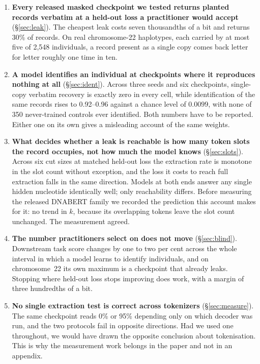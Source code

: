 \begin{enumerate}\itemsep2pt
\item \textbf{Every released masked checkpoint we tested returns planted records verbatim at a
held-out loss a practitioner would accept} (\S\ref{sec:leak}). The cheapest leak costs seven
thousandths of a bit and returns 30\% of records. On real chromosome-22 haplotypes, each carried by
at most five of 2{,}548 individuals, a record present as a single copy comes back letter for letter
roughly one time in ten.

\item \textbf{A model identifies an individual at checkpoints where it reproduces nothing at all}
(\S\ref{sec:ident}). Across three seeds and six checkpoints, single-copy verbatim recovery is exactly
zero in every cell, while identification of the same records rises to 0.92--0.96 against a chance
level of $0.0099$, with none of 350 never-trained controls ever identified. Both numbers have to be
reported. Either one on its own gives a misleading account of the same weights.

\item \textbf{What decides whether a leak is reachable is how many token slots the record occupies,
not how much the model knows} (\S\ref{sec:slots}). Across six cut sizes at matched held-out loss the
extraction rate is monotone in the slot count without exception, and the loss it costs to reach full
extraction falls in the same direction. Models at both ends answer any single hidden nucleotide
identically well; only reachability differs. Before measuring the released DNABERT family we
recorded the prediction this account makes for it: no trend in $k$, because its overlapping tokens
leave the slot count unchanged. The measurement agreed.

\item \textbf{The number practitioners select on does not move} (\S\ref{sec:blind}). Downstream task
score changes by one to two per cent across the whole interval in which a model learns to identify
individuals, and on chromosome~22 its own maximum is a checkpoint that already leaks. Stopping where
held-out loss stops improving does work, with a margin of three hundredths of a bit.

\item \textbf{No single extraction test is correct across tokenizers} (\S\ref{sec:measure}). The same
checkpoint reads 0\% or 95\% depending only on which decoder was run, and the two protocols fail in
opposite directions. Had we used one throughout, we would have drawn the opposite conclusion about
tokenisation. This is why the measurement work belongs in the paper and not in an appendix.
\end{enumerate}

